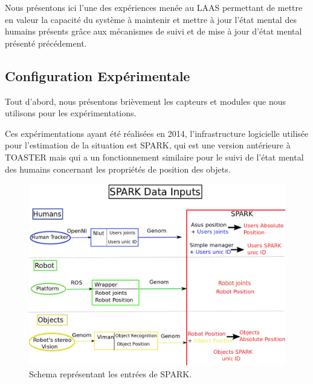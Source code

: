 \documentclass[a4paper,11pt,twoside]{StyleThese}
\begin{document}
Nous présentons ici l'une des expériences menée au LAAS permettant de mettre en valeur la capacité du système à maintenir et mettre à jour l'état mental des humains présents grâce aux mécanismes de suivi et de mise à jour d'état mental présenté précédement.

\subsection{Configuration Expérimentale}
\label{sec:chap2expconf}
Tout d'abord, nous présentons brièvement les capteurs et modules que nous utilisons pour les expérimentations.


Ces expérimentations ayant été réalisées en 2014, l'infrastructure logicielle utilisée pour l'estimation de la situation est SPARK\cite{Milliez2014}, qui est une version antérieure à TOASTER mais qui a un fonctionnement similaire pour le suivi de l'état mental des humains concernant les propriétés de position des objets.

\begin{figure}[ht!]
  \centering
 \includegraphics[width=0.99\linewidth]{./img/spark_input.png} 
  \caption {Schema représentant les entrées de SPARK.}
  \label{fig:inputSpark}
\end{figure}
\end{document}
